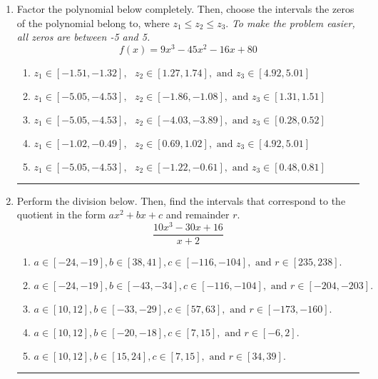 \documentclass[14pt]{extbook}
\newcommand{\litem}[1]{\item#1\hspace*{-1cm}\rule{\textwidth}{0.4pt}}
\begin{document}
\begin{enumerate}
{\begin{enumerate}[label=\Alph*.]
\end{enumerate} }
\litem{
Factor the polynomial below completely. Then, choose the intervals the zeros of the polynomial belong to, where $z_1 \leq z_2 \leq z_3$. \textit{To make the problem easier, all zeros are between -5 and 5.}\[ f(x) = 9x^{3} -45 x^{2} -16 x + 80 \]\begin{enumerate}[label=\Alph*.]
\item \( z_1 \in [-1.51, -1.32], \text{   }  z_2 \in [1.27, 1.74], \text{   and   } z_3 \in [4.92, 5.01] \)
\item \( z_1 \in [-5.05, -4.53], \text{   }  z_2 \in [-1.86, -1.08], \text{   and   } z_3 \in [1.31, 1.51] \)
\item \( z_1 \in [-5.05, -4.53], \text{   }  z_2 \in [-4.03, -3.89], \text{   and   } z_3 \in [0.28, 0.52] \)
\item \( z_1 \in [-1.02, -0.49], \text{   }  z_2 \in [0.69, 1.02], \text{   and   } z_3 \in [4.92, 5.01] \)
\item \( z_1 \in [-5.05, -4.53], \text{   }  z_2 \in [-1.22, -0.61], \text{   and   } z_3 \in [0.48, 0.81] \)

\end{enumerate} }
\litem{
Perform the division below. Then, find the intervals that correspond to the quotient in the form $ax^2+bx+c$ and remainder $r$.\[ \frac{10x^{3} -30 x + 16}{x + 2} \]\begin{enumerate}[label=\Alph*.]
\item \( a \in [-24, -19], b \in [38, 41], c \in [-116, -104], \text{ and } r \in [235, 238]. \)
\item \( a \in [-24, -19], b \in [-43, -34], c \in [-116, -104], \text{ and } r \in [-204, -203]. \)
\item \( a \in [10, 12], b \in [-33, -29], c \in [57, 63], \text{ and } r \in [-173, -160]. \)
\item \( a \in [10, 12], b \in [-20, -18], c \in [7, 15], \text{ and } r \in [-6, 2]. \)
\item \( a \in [10, 12], b \in [15, 24], c \in [7, 15], \text{ and } r \in [34, 39]. \)


\end{enumerate}}
\end{enumerate}
\end{document}
